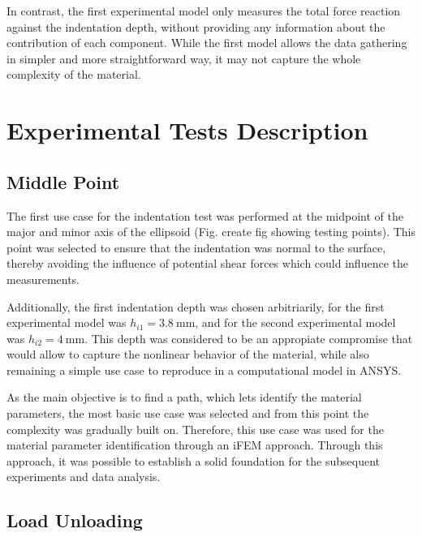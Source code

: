 In contrast, the first experimental model only measures the total force reaction 
against the indentation depth, without providing any information about the contribution 
of each component. While the first model allows the data 
gathering in simpler and more straightforward way, it may not capture 
the whole complexity of the material.


\section{Experimental Tests Description}

\subsection{Middle Point}
\label{subsection:midpoint}
The first use case for the indentation test was performed at the midpoint 
of the major and minor axis of the ellipsoid (Fig. create fig showing testing points). This point was selected 
to ensure that the indentation was normal to the surface, thereby avoiding 
the influence of potential shear forces which could influence the 
measurements.

Additionally, the first indentation depth was chosen arbitriarily, for the first 
experimental model was $h_{i1} = \SI{3.8}{\milli \m}$, and for the second 
experimental model was $h_{i2} = \SI{4}{\milli \m}$. This depth was considered 
to be an appropiate compromise that would allow to capture the nonlinear 
behavior of the material, while also remaining a simple use case to 
reproduce in a computational model in ANSYS.

As the main objective is to find a path, which lets identify the material 
 parameters, the most basic use case was selected and from this point 
the complexity was gradually built on. Therefore, this use case was used for the material 
parameter identification through an iFEM approach. Through this approach, it was possible 
to establish a solid foundation for the subsequent experiments and data analysis.

\subsection{Load Unloading}
\label{subsection:loadunload}

